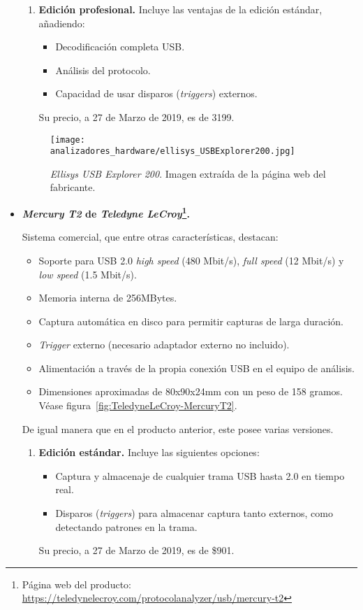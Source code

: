 \begin{itemize}
\begin{enumerate}
        \item \textbf{Edición profesional.}
        Incluye las ventajas de la edición estándar, añadiendo:
        \begin{itemize}
            \item Decodificación completa USB.
            \item Análisis del protocolo.
            \item Capacidad de usar disparos (\emph{triggers}) externos.
        \end{itemize}
        Su precio, a 27 de Marzo de 2019, es de 3199\texteuro.
    \end{enumerate}    
    \begin{figure}[htb]
        \centering
        \texttt{[image: analizadores\_hardware/ellisys\_USBExplorer200.jpg]}
        \caption{\emph{Ellisys USB Explorer 200}. Imagen extraída de la página web del fabricante.}
        \label{fig:ellisys-Explorer200}
    \end{figure}
    
    \item \textbf{\emph{Mercury T2} de \emph{Teledyne LeCroy}\footnote{Página web del producto: \url{https://teledynelecroy.com/protocolanalyzer/usb/mercury-t2}}.}
    
    Sistema comercial, que entre otras características\cite{teledynelecroy2014}, destacan:
    \begin{itemize}
        \item Soporte para USB 2.0 \emph{high speed} (480 Mbit/s), \emph{full speed} (12 Mbit/s) y \emph{low speed} (1.5 Mbit/s).
        \item Memoria interna de 256MBytes.
        \item Captura automática en disco para permitir capturas de larga duración.
        \item \emph{Trigger} externo (necesario adaptador externo no incluido).
        \item Alimentación a través de la propia conexión USB en el equipo de análisis.
        \item Dimensiones aproximadas de 80x90x24mm con un peso de 158 gramos. Véase figura~\ref{fig:TeledyneLeCroy-MercuryT2}.
    \end{itemize}
    
    De igual manera que en el producto anterior, este posee varias versiones.

    \begin{enumerate}
        \item \textbf{Edición estándar.}
        Incluye las siguientes opciones:
        \begin{itemize}
            \item Captura y almacenaje de cualquier trama USB hasta 2.0 en tiempo real.
            \item Disparos (\emph{triggers}) para almacenar captura tanto externos, como detectando patrones en la trama.
        \end{itemize}
        Su precio, a 27 de Marzo de 2019, es de \$901.
        

\end{enumerate}
\end{itemize}
